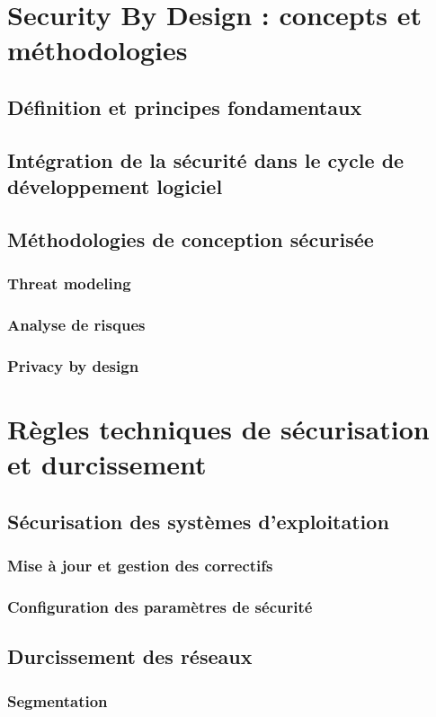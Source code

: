 \section{Security By Design : concepts et méthodologies}
\subsection{Définition et principes fondamentaux}
\subsection{Intégration de la sécurité dans le cycle de développement logiciel}
\subsection{Méthodologies de conception sécurisée}
\subsubsection{Threat modeling}
\subsubsection{Analyse de risques}
\subsubsection{Privacy by design}
\section{Règles techniques de sécurisation et durcissement}
\subsection{Sécurisation des systèmes d'exploitation}
\subsubsection{Mise à jour et gestion des correctifs}
\subsubsection{Configuration des paramètres de sécurité}
\subsection{Durcissement des réseaux}
\subsubsection{Segmentation}
